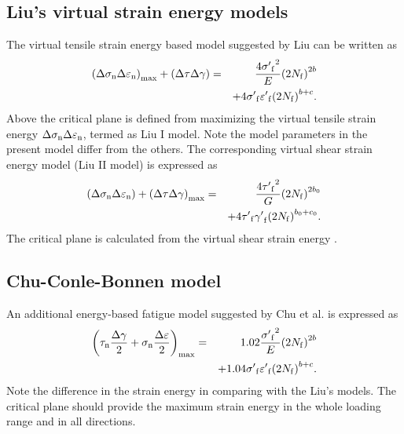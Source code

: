\documentclass[preprint,5p,twocolumn,10pt,sort&compress]{elsarticle}
\begin{document}
\subsection{Liu's virtual strain energy models}
The virtual tensile strain energy based model suggested by Liu \cite{Liu1993} can be written as
\begin{eqnarray*}
{\left( {\Delta {\sigma _{\rm n}}\Delta {\varepsilon _{\rm n}}} \right)_{\max }} + \left( {\Delta \tau \Delta \gamma } \right) &=& \frac{{4{{\sigma '}_{\rm f}}^2}}{E}{\left( {2{N_{\rm f}}} \right)^{2b}}
\\
& & + 4{{\sigma '}_{\rm f}}{{\varepsilon '}_{\rm f}}{\left( {2{N_{\rm f}}} \right)^{b + c}}.
\end{eqnarray*}
Above the critical plane is defined from maximizing the virtual tensile strain energy ${\Delta {\sigma _{\rm n}}\Delta {\varepsilon _{\rm n}}}$, termed as Liu I model. Note the model parameters in the present model differ from the others. The corresponding virtual shear strain energy model (Liu II model) is expressed as
\begin{eqnarray*}
\left( {\Delta {\sigma _{\rm n}}\Delta {\varepsilon _{\rm n}}} \right) + {\left( {\Delta \tau \Delta \gamma } \right)_{\max }} &=& \frac{{4{{\tau '}_{\rm f}}^2}}{G}{\left( {2{N_{\rm f}}} \right)^{2b_0 }}
\\
&& + 4{{\tau '}_{\rm f}}{{\gamma '}_{\rm f}}{\left( {2{N_{\rm f}}} \right)^{b_0  + c_0 }}.
\end{eqnarray*}
The critical plane is calculated from the virtual shear strain energy \cite{Liu1993}.

\subsection{Chu-Conle-Bonnen model}
An additional energy-based fatigue model suggested by Chu et al. \cite{Chu1993} is expressed as
\begin{eqnarray}
{\left( {{\tau _{\rm n}}\frac{{\Delta \gamma }}{2} + {\sigma _{\rm n }}\frac{{\Delta \varepsilon }}{2}} \right)_{\max }} &=& 1.02\frac{{{{\sigma '}_{\rm f}}^2}}{E}{\left( {2{N_{\rm f}}} \right)^{2b}} \\
&& + 1.04{{\sigma '}_{\rm f}}{{\varepsilon '}_{\rm f}}{\left( {2{N_{\rm f}}} \right)^{b + c}}. \nonumber
\end{eqnarray}
Note the difference in the strain energy in comparing with the Liu's models. The critical plane should provide the maximum strain energy in the whole loading range and in all directions.
\end{document}
